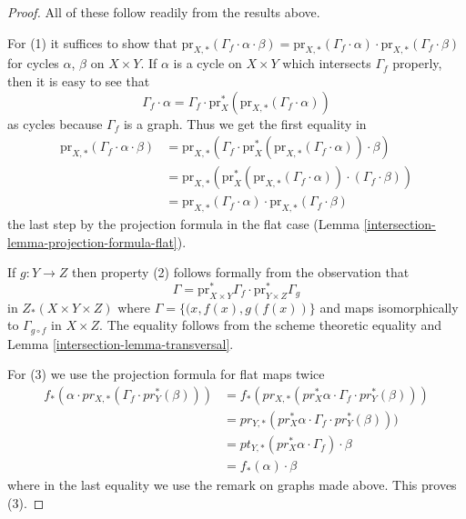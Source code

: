 \begin{proof}

All of these follow readily from the results above.

\medskip\noindent
For (1) it suffices to show that
$\text{pr}_{X,*}( \Gamma_f \cdot \alpha \cdot \beta) =
\text{pr}_{X,*}(\Gamma_f \cdot \alpha) \cdot
\text{pr}_{X,*}(\Gamma_f \cdot \beta)$
for cycles $\alpha$, $\beta$ on $X \times Y$. If $\alpha$ is a cycle on
$X \times Y$ which intersects $\Gamma_f$ properly, then it is easy
to see that
$$
\Gamma_f \cdot \alpha =
\Gamma_f \cdot \text{pr}_X^*(\text{pr}_{X,*}(\Gamma_f \cdot \alpha))
$$
as cycles because $\Gamma_f$ is a graph. Thus we get the first
equality in
\begin{align*}
\text{pr}_{X,*}(\Gamma_f \cdot \alpha \cdot \beta)
& =
\text{pr}_{X,*}(
\Gamma_f \cdot
\text{pr}_X^*(\text{pr}_{X,*}(\Gamma_f \cdot \alpha)) \cdot \beta) \\
& =
\text{pr}_{X,*}(\text{pr}_X^*(\text{pr}_{X,*}(\Gamma_f \cdot \alpha))
\cdot (\Gamma_f \cdot \beta)) \\
& =
\text{pr}_{X,*}(\Gamma_f \cdot \alpha) \cdot
\text{pr}_{X,*}(\Gamma_f \cdot \beta)
\end{align*}
the last step by the projection formula in the flat case
(Lemma \ref{intersection-lemma-projection-formula-flat}).

\medskip\noindent
If $g : Y \to Z$ then property (2) follows formally from the observation that
$$
\Gamma =
\text{pr}_{X \times Y}^*\Gamma_f \cdot
\text{pr}_{Y \times Z}^*\Gamma_g
$$
in $Z_*(X \times Y \times Z)$ where $\Gamma = \{(x, f(x), g(f(x))\}$
and maps isomorphically to $\Gamma_{g \circ f}$ in $X \times Z$.
The equality follows from the scheme theoretic equality and
Lemma \ref{intersection-lemma-transversal}.

\medskip\noindent
For (3) we use the projection formula for flat maps twice
\begin{align*}
f_*(\alpha \cdot pr_{X, *}(\Gamma_f \cdot pr_Y^*(\beta)))
& =
f_*(pr_{X, *}(pr_X^*\alpha \cdot \Gamma_f \cdot pr_Y^*(\beta))) \\
& =
pr_{Y, *}(pr_X^*\alpha \cdot \Gamma_f \cdot pr_Y^*(\beta))) \\
& =
pt_{Y, *}(pr_X^*\alpha \cdot \Gamma_f) \cdot \beta \\
& =
f_*(\alpha) \cdot \beta
\end{align*}
where in the last equality we use the remark on graphs made above.
This proves (3).


\end{proof}
